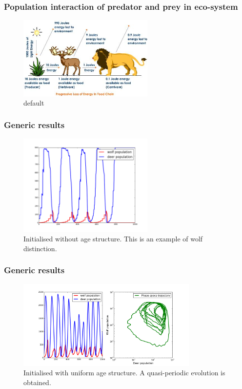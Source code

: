 \documentclass{beamer}
\begin{document}
\frame
{
	\frametitle{Population interaction of predator and prey in eco-system}

	\begin{figure}[htbp]
	\begin{center}
	\includegraphics[width=0.6\textwidth]{./pics/progressive-energy-loss.jpeg}
	\caption{default}
	\label{default}
	\end{center}
	\end{figure}
}

\frame
{
	\frametitle{Generic results}

	\begin{figure}[htbp]
	\begin{center}
	\includegraphics[width=0.6\textwidth]{./pics/age_structure.png}
	\caption{Initialised without age structure. This is an example of wolf distinction.}
	\label{default}
	\end{center}
	\end{figure}
}

\frame
{
	\frametitle{Generic results}

	\begin{figure}[htbp]
	\begin{center}
	\includegraphics[width=0.8\textwidth]{./pics/phase_space.png}
	\caption{Initialised with uniform age structure. A quasi-periodic evolution is obtained.}
	\label{default}
	\end{center}
	\end{figure}
}
\end{document}
